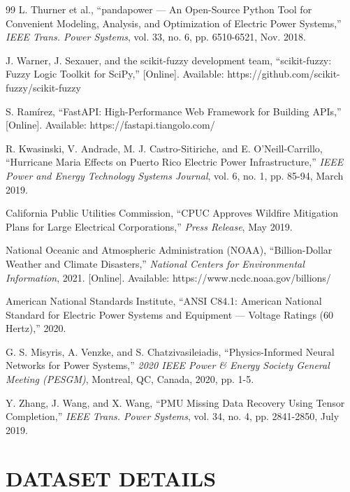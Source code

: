 \documentclass[12pt,a4paper]{report}
\begin{document}
\begin{thebibliography}{99}
L. Thurner et al.,
``pandapower — An Open-Source Python Tool for Convenient Modeling, Analysis, and Optimization of Electric Power Systems,''
\textit{IEEE Trans. Power Systems},
vol. 33, no. 6, pp. 6510-6521, Nov. 2018.

J. Warner, J. Sexauer, and  the scikit-fuzzy development team,
``scikit-fuzzy: Fuzzy Logic Toolkit for SciPy,''
[Online]. Available: https://github.com/scikit-fuzzy/scikit-fuzzy

S. Ramírez,
``FastAPI: High-Performance Web Framework for Building APIs,''
[Online]. Available: https://fastapi.tiangolo.com/

R. Kwasinski, V. Andrade, M. J. Castro-Sitiriche, and E. O'Neill-Carrillo,
``Hurricane Maria Effects on Puerto Rico Electric Power Infrastructure,''
\textit{IEEE Power and Energy Technology Systems Journal},
vol. 6, no. 1, pp. 85-94, March 2019.

California Public Utilities Commission,
``CPUC Approves Wildfire Mitigation Plans for Large Electrical Corporations,''
\textit{Press Release}, May 2019.

National Oceanic and Atmospheric Administration (NOAA),
``Billion-Dollar Weather and Climate Disasters,''
\textit{National Centers for Environmental Information}, 2021.
[Online]. Available: https://www.ncdc.noaa.gov/billions/

American National Standards Institute,
``ANSI C84.1: American National Standard for Electric Power Systems and Equipment — Voltage Ratings (60 Hertz),''
2020.

G. S. Misyris, A. Venzke, and S. Chatzivasileiadis,
``Physics-Informed Neural Networks for Power Systems,''
\textit{2020 IEEE Power \& Energy Society General Meeting (PESGM)},
Montreal, QC, Canada, 2020, pp. 1-5.

Y. Zhang, J. Wang, and X. Wang,
``PMU Missing Data Recovery Using Tensor Completion,''
\textit{IEEE Trans. Power Systems},
vol. 34, no. 4, pp. 2841-2850, July 2019.

\end{thebibliography}

\appendix

\chapter{DATASET DETAILS}
\end{document}
